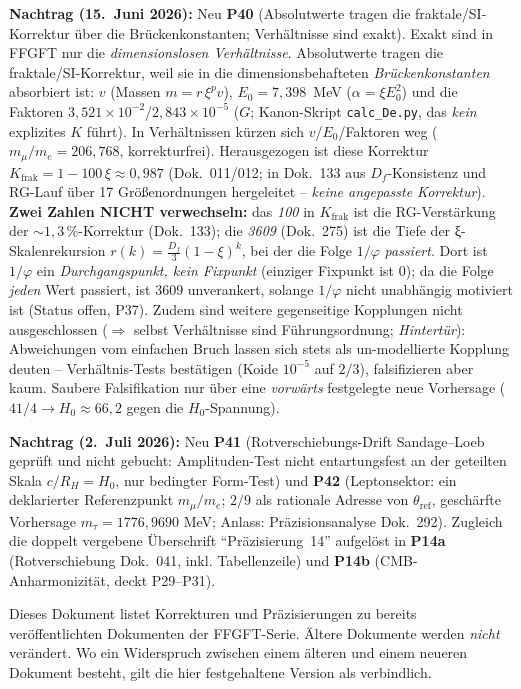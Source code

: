 \textbf{Nachtrag (15.~Juni 2026):} Neu \textbf{P40} (Absolutwerte tragen die
fraktale/SI-Korrektur über die Brückenkonstanten; Verhältnisse sind exakt). Exakt sind
in FFGFT nur die \emph{dimensionslosen Verhältnisse}. Absolutwerte tragen die
fraktale/SI-Korrektur, weil sie in die dimensionsbehafteten \emph{Brückenkonstanten}
absorbiert ist: $v$ (Massen $m=r\,\xi^{p}v$), $E_0=7{,}398$~MeV ($\alpha=\xi E_0^2$) und
die Faktoren $3{,}521\times10^{-2}$/$2{,}843\times10^{-5}$ ($G$; Kanon-Skript
\texttt{calc\_De.py}, das \emph{kein} explizites $K$ führt). In Verhältnissen kürzen sich
$v$/$E_0$/Faktoren weg ($m_\mu/m_e=206{,}768$, korrekturfrei). Herausgezogen ist diese
Korrektur $K_{\text{frak}}=1-100\,\xi\approx0{,}987$ (Dok.~011/012; in Dok.~133 aus
$D_f$-Konsistenz und RG-Lauf über 17 Größenordnungen hergeleitet -- \emph{keine angepasste
Korrektur}). \textbf{Zwei Zahlen NICHT verwechseln:} das \emph{100} in $K_{\text{frak}}$ ist
die RG-Verstärkung der ${\sim}1{,}3\,\%$-Korrektur (Dok.~133); die \emph{3609} (Dok.~275) ist
die Tiefe der ξ-Skalenrekursion $r(k)=\tfrac{D_f}{3}(1-\xi)^k$, bei der die Folge $1/\varphi$
\emph{passiert}. Dort ist $1/\varphi$ ein \emph{Durchgangspunkt, kein Fixpunkt} (einziger
Fixpunkt ist $0$); da die Folge \emph{jeden} Wert passiert, ist 3609 unverankert, solange
$1/\varphi$ nicht unabhängig motiviert ist (Status offen, P37). Zudem sind weitere
gegenseitige Kopplungen nicht ausgeschlossen ($\Rightarrow$ selbst Verhältnisse sind
Führungsordnung; \emph{Hintertür}): Abweichungen vom einfachen Bruch lassen sich stets als
un-modellierte Kopplung deuten -- Verhältnis-Tests bestätigen (Koide $10^{-5}$ auf $2/3$),
falsifizieren aber kaum. Saubere Falsifikation nur über eine \emph{vorwärts} festgelegte
neue Vorhersage ($41/4 \to H_0 \approx 66{,}2$ gegen die $H_0$-Spannung).

\textbf{Nachtrag (2.~Juli 2026):} Neu \textbf{P41} (Rotverschiebungs-Drift
Sandage--Loeb geprüft und nicht gebucht: Amplituden-Test nicht entartungsfest
an der geteilten Skala $c/R_H=H_0$, nur bedingter Form-Test) und
\textbf{P42} (Leptonsektor: ein deklarierter Referenzpunkt $m_\mu/m_e$;
$2/9$ als rationale Adresse von $\theta_{\text{ref}}$, geschärfte Vorhersage
$m_\tau=1776{,}9690$ MeV; Anlass: Präzisionsanalyse Dok.~292). Zugleich die
doppelt vergebene Überschrift \enquote{Präzisierung~14} aufgelöst in
\textbf{P14a} (Rotverschiebung Dok.~041, inkl. Tabellenzeile) und
\textbf{P14b} (CMB-Anharmonizität, deckt P29--P31).


\bigskip
Dieses Dokument listet Korrekturen und Präzisierungen zu bereits
veröffentlichten Dokumenten der FFGFT-Serie. Ältere Dokumente werden
\emph{nicht} verändert. Wo ein Widerspruch zwischen einem älteren und
einem neueren Dokument besteht, gilt die hier festgehaltene Version als
verbindlich.

